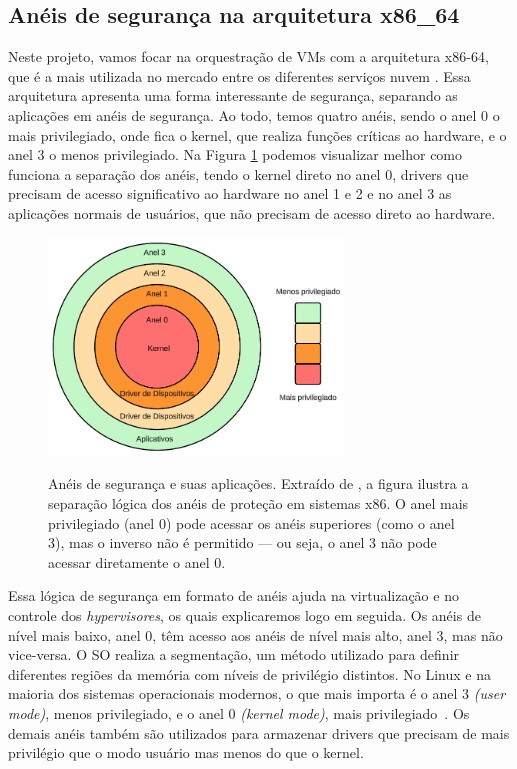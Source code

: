 \subsection{Anéis de segurança na arquitetura x86\_64}
Neste projeto, vamos focar na orquestração de VMs com a arquitetura x86-64, que é a mais utilizada no mercado entre os diferentes serviços nuvem \citep{DataCenterCPUMarketAMDSurpassesIntelinShareGrowth}. Essa arquitetura apresenta uma forma interessante de segurança, separando as aplicações em anéis de segurança. Ao todo, temos quatro anéis, sendo o anel 0 o mais privilegiado, onde fica o kernel, que realiza funções críticas ao hardware, e o anel 3 o menos privilegiado. Na Figura \ref{fig:rings_x86} podemos visualizar melhor como funciona a separação dos anéis, tendo o kernel direto no anel 0, drivers que precisam de acesso significativo ao hardware no anel 1 e 2 e no anel 3 as aplicações normais de usuários, que não precisam de acesso direto ao hardware.


\begin{figure}[htbp]
  \centering
  \caption{Anéis de segurança e suas aplicações. Extraído de \citep{chirammal2016mastering}, a figura ilustra a separação lógica dos anéis de proteção em sistemas x86. O anel mais privilegiado (anel 0) pode acessar os anéis superiores (como o anel 3), mas o inverso não é permitido — ou seja, o anel 3 não pode acessar diretamente o anel 0.}
  \includegraphics[width=0.7\textwidth]{images/rings_x86.png}
  \label{fig:rings_x86}
\end{figure}

Essa lógica de segurança em formato de anéis ajuda na virtualização e no controle dos \textit{hypervisores}, os quais explicaremos logo em seguida. Os anéis de nível mais baixo, anel 0, têm acesso aos anéis de nível mais alto, anel 3, mas não vice-versa. O SO realiza a segmentação, um método utilizado para definir diferentes regiões da memória com níveis de privilégio distintos. No Linux e na maioria dos sistemas operacionais modernos, o que mais importa é o anel 3 \textit{(user mode)}, menos privilegiado, e o anel 0 \textit{(kernel mode)}, mais privilegiado~\citep{modernOS}. Os demais anéis também são utilizados para armazenar drivers que precisam de mais privilégio que o modo usuário mas menos do que o kernel.


